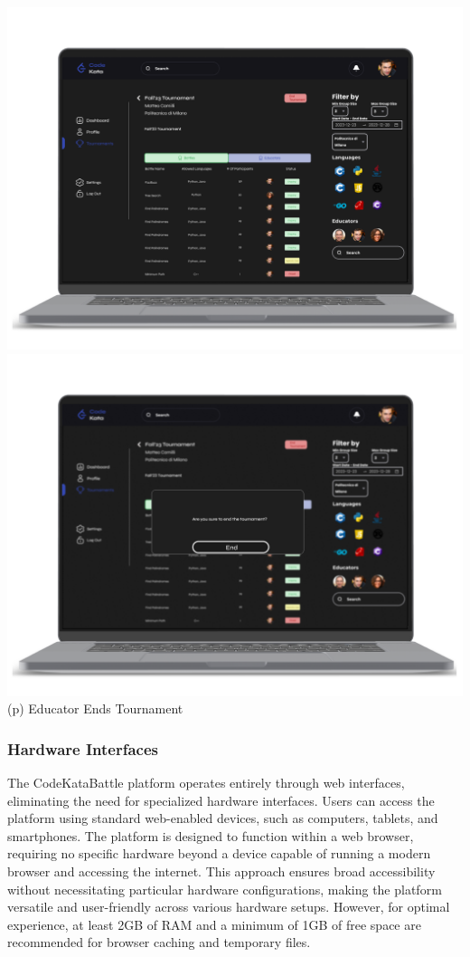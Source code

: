 \newpage
\begin{center}
\includegraphics[scale=0.13]{Images/ui-ux/educator_end_tournament/educator_end_tournament.png}
\includegraphics[scale=0.13]{Images/ui-ux/educator_end_tournament/educator_end_tournament_1.png}
        (p) Educator Ends Tournament
\end{center}
\newpage
    
\subsubsection{Hardware Interfaces}
The CodeKataBattle platform operates entirely through web interfaces, eliminating the need for specialized hardware interfaces. Users can access the platform using standard web-enabled devices, such as computers, tablets, and smartphones. The platform is designed to function within a web browser, requiring no specific hardware beyond a device capable of running a modern browser and accessing the internet. This approach ensures broad accessibility without necessitating particular hardware configurations, making the platform versatile and user-friendly across various hardware setups. However, for optimal experience, at least 2GB of RAM and a minimum of 1GB of free space are recommended for browser caching and temporary files.

